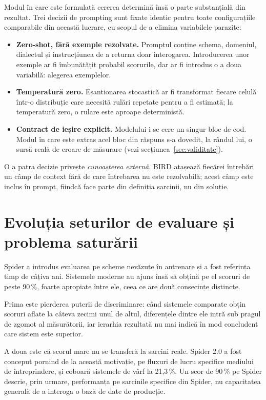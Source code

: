 \documentclass[12pt,a4paper]{report}
\begin{document}
Modul în care este formulată cererea determină însă o parte substanțială din
rezultat. Trei decizii de prompting sunt fixate identic pentru toate configurațiile
comparabile din această lucrare, cu scopul de a elimina variabilele
parazite:

\begin{itemize}[nosep,leftmargin=*]
  \item \textbf{Zero-shot, fără exemple rezolvate.} Promptul conține schema,
    domeniul, dialectul și instrucțiunea de a returna doar interogarea.
    Introducerea unor exemple ar fi îmbunătățit probabil scorurile, dar ar fi
    introdus o a doua variabilă: alegerea exemplelor.
  \item \textbf{Temperatură zero.} Eșantionarea stocastică ar fi transformat
    fiecare celulă într-o distribuție care necesită rulări repetate pentru a
    fi estimată; la temperatură zero, o rulare este aproape deterministă.
  \item \textbf{Contract de ieșire explicit.} Modelului i se cere un singur
    bloc de cod. Modul în care este extras acel bloc din răspuns s-a dovedit,
    la rândul lui, o sursă reală de eroare de măsurare (vezi secțiunea~\ref{sec:validitate}).
\end{itemize}

O a patra decizie privește \emph{cunoașterea externă}. BIRD atașează
fiecărei întrebări un câmp de context fără de care întrebarea nu este
rezolvabilă; acest câmp este inclus în prompt, fiindcă face parte din
definiția sarcinii, nu din soluție.

\section{Evoluția seturilor de evaluare și problema saturării}

Spider \cite{spider} a introdus evaluarea pe scheme nevăzute în antrenare și
a fost referința timp de câțiva ani. Sistemele moderne au ajuns însă să obțină
pe el scoruri de peste 90\,\%, foarte apropiate între ele, ceea ce are două
consecințe distincte.

Prima este pierderea puterii de discriminare: când sistemele comparate obțin
scoruri aflate la câteva zecimi unul de altul, diferențele dintre ele intră
sub pragul de zgomot al măsurătorii, iar ierarhia rezultată nu mai indică în mod concludent
care sistem este superior.

A doua este că scorul mare nu se transferă la sarcini reale. Spider 2.0
\cite{spider2} a fost conceput pornind de la această motivație, pe fluxuri de lucru
specifice mediului de întreprindere, și coboară sistemele de vârf la 21,3\,\%. Un scor de 90\,\% pe
Spider descrie, prin urmare, performanța pe sarcinile specifice din Spider,
nu capacitatea generală de a interoga o bază de date de producție.
\end{document}
